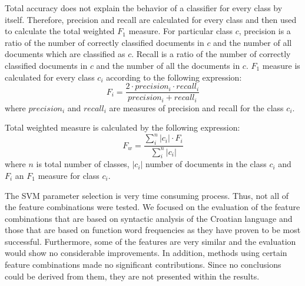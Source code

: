 \documentclass{llncs}
\begin{document}

Total accuracy does not explain the behavior of a classifier for every class by
itself. Therefore, precision and recall are calculated for every class and then
used to calculate the total weighted $F_1$ measure. For particular class $c$,
precision is a ratio of the number of correctly classified documents in $c$ and the number
of all documents which are classified as $c$. Recall is a ratio of the number of correctly
classified documents in $c$ and the number of all the documents in $c$. $F_1$ measure
is calculated for every class $c_i$ according to the following expression:
\begin{equation}
F_i = \frac{2 \cdot precision_i \cdot recall_i}{precision_i + recall_i}
\end{equation}
where $precision_i$ and $recall_i$ are measures of precision and recall for
the class $c_i$.

Total weighted measure is calculated by the following expression:
\begin{equation}
F_w = \frac{\sum^{n}_i |c_i|\cdot F_i}{\sum^n_i|c_i|}
\end{equation}
where $n$ is total number of classes, $|c_i|$ number of documents in the class
$c_i$ and $F_i$ an $F_1$ measure for class $c_i$.

The SVM parameter selection is very time consuming process. Thus, not all of the
feature combinations were tested. We focused on the evaluation of the feature
combinations that are based on syntactic analysis of the Croatian language and those
that are based on function word frequencies as they have proven to be most successful.
Furthermore, some of the features are very similar and the evaluation would show no considerable improvements. %
In addition, methods using certain
feature combinations made no significant contributions. Since no conclusions
could be derived from them, they are not presented within the results.
\end{document}
